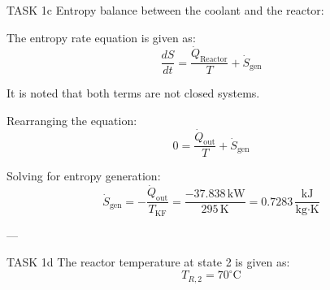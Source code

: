 TASK 1c  
Entropy balance between the coolant and the reactor:  

The entropy rate equation is given as:  
\[
\frac{dS}{dt} = \frac{\dot{Q}_{\text{Reactor}}}{T} + \dot{S}_{\text{gen}}
\]  

It is noted that both terms are not closed systems.  

Rearranging the equation:  
\[
0 = \frac{\dot{Q}_{\text{out}}}{T} + \dot{S}_{\text{gen}}
\]  

Solving for entropy generation:  
\[
\dot{S}_{\text{gen}} = -\frac{\dot{Q}_{\text{out}}}{T_{\text{KF}}} = \frac{-37.838 \, \text{kW}}{295 \, \text{K}} = 0.7283 \, \frac{\text{kJ}}{\text{kg·K}}
\]  

---

TASK 1d  
The reactor temperature at state 2 is given as:  
\[
T_{R,2} = 70^\circ\text{C}
\]  